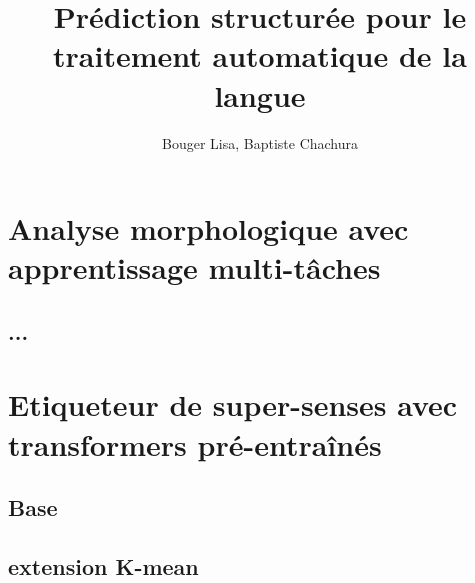 \documentclass[12pt]{article}
\title{Prédiction structurée pour le traitement automatique de la langue}
\author{Bouger Lisa, Baptiste Chachura}
\begin{document}
\maketitle

\vspace{0.5in}

\tableofcontents %
\newpage

\section{Analyse morphologique avec apprentissage multi-tâches}

\subsection{...}


\section{Etiqueteur de super-senses avec transformers pré-entraînés}

\subsection{Base}

\subsection{extension K-mean }
\end{document}
